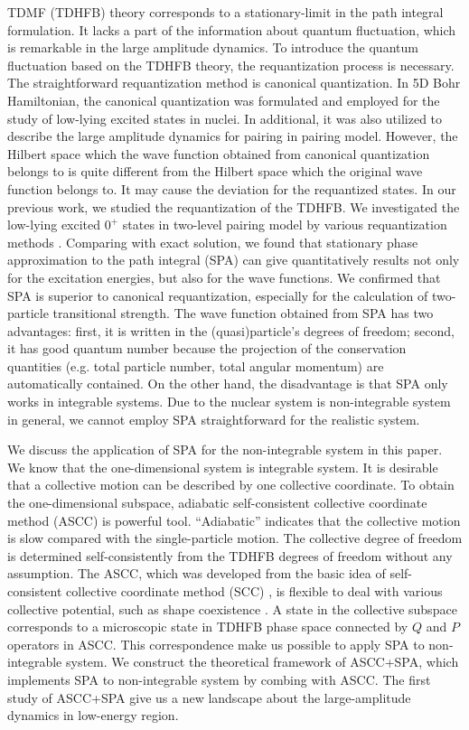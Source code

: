 \documentclass[%
superscriptaddress,
showpacs,
nofootinbib,
amsmath,amssymb,
aps,
prc,
twocolumn,
floatfix ]%
{revtex4-1}
\begin{document}
TDMF (TDHFB) theory corresponds to a stationary-limit in the path integral formulation. It lacks a part of the information about quantum fluctuation, which is remarkable in the large amplitude dynamics. To introduce the quantum fluctuation based on the TDHFB theory, the requantization process is necessary. The straightforward requantization method is canonical quantization. In 5D Bohr Hamiltonian, the canonical quantization was formulated and employed for the study of low-lying excited states in nuclei. In additional, it was also utilized to describe the large amplitude dynamics for pairing in pairing model. However, the Hilbert space which the wave function obtained from canonical quantization belongs to is quite different from the Hilbert space which the original wave function belongs to. It may cause the deviation for the requantized states. In our previous work, we studied the requantization of the TDHFB. We investigated the low-lying excited $0^+$ states in two-level pairing model by various requantization methods \cite{NN18}. Comparing with exact solution, we found that stationary phase approximation to the path integral (SPA) can give quantitatively results not only for the excitation energies, but also for the wave functions. We confirmed that SPA is superior to canonical requantization, especially for the calculation of two-particle transitional strength. The wave function obtained from SPA has two advantages: first, it is written in the (quasi)particle's degrees of freedom; second, it has good quantum number because the projection of the conservation quantities (e.g. total particle number, total angular momentum) are automatically contained. On the other hand, the disadvantage is that SPA only works in integrable systems. Due to the nuclear system is non-integrable system in general, we cannot employ SPA straightforward for the realistic system. \par
We discuss the application of SPA for the non-integrable system in this paper. We know that the one-dimensional system is integrable system. It is desirable that a collective motion can be described by one collective coordinate. To obtain the one-dimensional subspace, adiabatic self-consistent collective coordinate method (ASCC) is powerful tool.
``Adiabatic'' indicates that the collective motion is slow compared with the single-particle motion. The collective degree of freedom is determined self-consistently from the TDHFB degrees of freedom without any assumption. The ASCC, which was developed from the basic idea of self-consistent collective coordinate method (SCC) \cite{MMSK80}, is flexible to deal with various collective potential, such as shape coexistence \cite{KNMM05, HNMM07, HNMM08}. A state in the collective subspace corresponds to a microscopic state in TDHFB phase space connected by $Q$ and $P$ operators in ASCC. This correspondence make us possible to apply SPA to non-integrable system. We construct the theoretical framework of ASCC+SPA, which implements SPA to non-integrable system by combing with ASCC. The first study of ASCC+SPA give us a new landscape about the large-amplitude dynamics in low-energy region.
\end{document}
